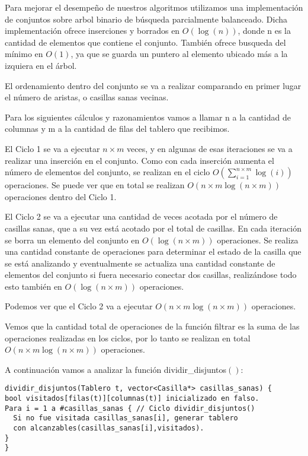\documentclass[a4paper, 12pt] {article}
\begin{document}
Para mejorar el desempe\~no de nuestros algoritmos utilizamos una implementaci\'on de conjuntos sobre arbol binario de b\'usqueda parcialmente balanceado. Dicha implementaci\'on ofrece inserciones y borrados en $O\left( \log\left( n\right) \right) $, donde n es la cantidad de elementos que contiene el conjunto. Tambi\'en ofrece busqueda del m\'inimo en $O\left( 1\right) $, ya que se guarda un puntero al elemento ubicado m\'as a la izquiera en el \'arbol.


El ordenamiento dentro del conjunto se va a realizar comparando en primer lugar el n\'umero de aristas, o casillas sanas vecinas.


Para los siguientes c\'alculos y razonamientos vamos a llamar n a la cantidad de columnas y m a la cantidad de filas del tablero que recibimos.


El Ciclo 1 se va a ejecutar $n\times m $ veces, y en algunas de esas iteraciones se va a realizar una inserci\'on en el conjunto. Como con cada inserci\'on aumenta el n\'umero de elementos del conjunto, se realizan en el ciclo $O\left( \textstyle\sum_{i=1}^{n\times m} \log\left( i\right) \right) $ operaciones. Se puede ver que en total se realizan $ O\left( n\times m \log\left( n\times m\right) \right) $ operaciones dentro del Ciclo 1.


El Ciclo 2 se va a ejecutar una cantidad de veces acotada por el n\'umero de casillas sanas, que a su vez est\'a acotado por el total de casillas. En cada iteraci\'on se borra un elemento del conjunto en $O\left( \log\left( n\times m \right) \right) $ operaciones. Se realiza una cantidad constante de operaciones para determinar el estado de la casilla que se est\'a analizando y eventualmente se actualiza una cantidad constante de elementos del conjunto si fuera necesario conectar dos casillas, realiz\'andose todo esto tambi\'en en $O\left( \log\left( n\times m\right) \right) $ operaciones. 


Podemos ver que el Ciclo 2 va a ejecutar $O\left( n\times m \log\left( n\times m\right) \right) $ operaciones.

Vemos que la cantidad total de operaciones de la funci\'on filtrar es la suma de las operaciones realizadas en los ciclos, por lo tanto se realizan en total $O\left( n\times m \log\left( n\times m\right) \right) $ operaciones.


A continuaci\'on vamos a analizar la funci\'on dividir\_disjuntos$\left( \right) $:

\begin{verbatim}
dividir_disjuntos(Tablero t, vector<Casilla*> casillas_sanas) {
bool visitados[filas(t)][columnas(t)] inicializado en falso.
Para i = 1 a #casillas_sanas { // Ciclo dividir_disjuntos()
  Si no fue visitada casillas_sanas[i], generar tablero
  con alcanzables(casillas_sanas[i],visitados).
}
}
\end{verbatim}
\end{document}
